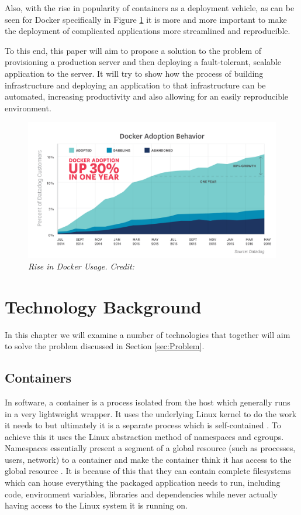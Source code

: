 \documentclass{article}
\begin{document}
Also, with the rise in popularity of containers as a deployment vehicle, as can be seen for Docker specifically in Figure \ref{fig:datadog} it is more and more important to make the deployment of complicated applications more streamlined and reproducible.

To this end, this paper will aim to propose a solution to the problem of provisioning a production server and then deploying a fault-tolerant, scalable application to the server. It will try to show how the process of building infrastructure and deploying an application to that infrastructure can be automated, increasing productivity and also allowing for an easily reproducible environment.

\begin{figure}[!h]
\centering
\includegraphics*[width=1\textwidth]{components/images/datadog}
\caption{\em Rise in Docker Usage. Credit: \citep{datadog}}
\label{fig:datadog}
\end{figure}
 
\newpage
\section{Technology Background}
\label{sec:Background}

In this chapter we will examine a number of technologies that together will aim to solve the problem discussed in Section \ref{sec:Problem}.

\subsection{Containers} %
\label{sub:Containers}
In software, a container is a process isolated from the host which generally runs in a very lightweight wrapper. It uses the underlying Linux kernel to do the work it needs to but ultimately it is a separate process which is self-contained \citep{Matthias2015}. To achieve this it uses the Linux abstraction method of namespaces and cgroups. Namespaces essentially present a segment of a global resource (such as processes, users, network) to a container and make the container think it has access to the global resource \citep{Kerrisk2013}. It is because of this that they can contain complete filesystems which can house everything the packaged application needs to run, including code, environment variables, libraries and dependencies while never actually having access to the Linux system it is running on.
\end{document}
